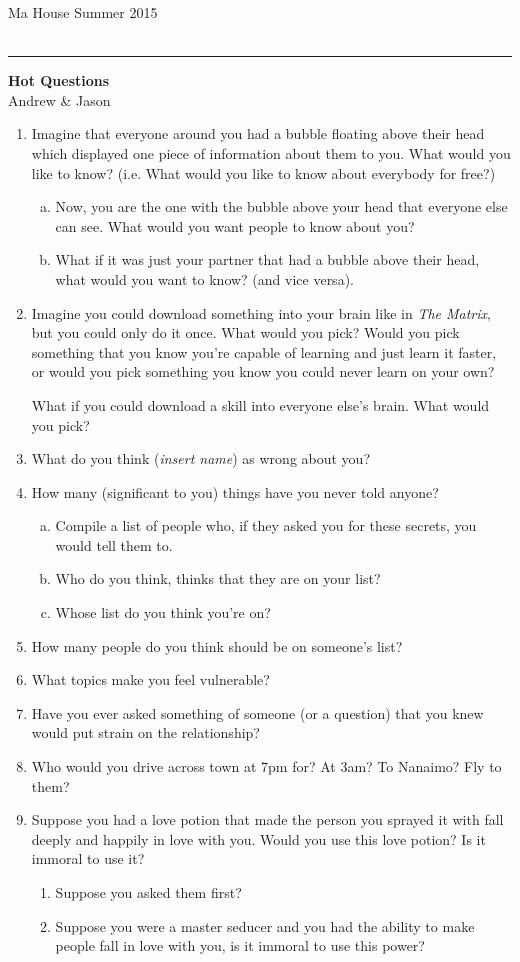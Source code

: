 \documentclass[11pt]{article}
\newcommand{\myheader}[4]{%
	\vspace*{-0.5in}
	\noindent
	{#1} \hfill {#3}\\
	{#2} \hfill {#4}\\
	\rule[8pt]{\textwidth}{1pt}
}
\newcommand{\mytitle}[2]{%
	\begin{center}
		{\large {\bf #1}}\\
		\bigskip
		#2\\ %
		\medskip
	\end{center}
}
\begin{document}
\myheader{Ma House}{}{Summer 2015}{}
\mytitle{Hot Questions}{Andrew \& Jason}

\begin{enumerate}
	\item Imagine that everyone around you had a bubble floating above their head which displayed one piece of information about
		them to you. What would you like to know? (i.e. What would you like to know about everybody for free?)
		\begin{enumerate}[(a)]
			\item Now, you are the one with the bubble above your head that everyone else can see. What would you want people to know
				about you?
			\item What if it was just your partner that had a bubble above their head, what would you want to know? (and vice versa).
		\end{enumerate}
	\item Imagine you could download something into your brain like in \emph{The Matrix}, but you could
		only do it once.  What would you pick?  Would you pick something that you know you're capable 
		of learning and just learn it faster, or would you pick something you know you could never learn
		on your own?

		What if you could download a skill into everyone else's brain.  What would you pick?

	\item What do you think (\emph{insert name}) as wrong about you?

	\item How many (significant to you) things have you never told anyone?
		\begin{enumerate}[(a)]
			\item Compile a list of people who, if they asked you for these secrets, you would tell them to.
			\item Who do you think, thinks that they are on your list?
			\item Whose list do you think you're on?
		\end{enumerate}

	\item How many people do you think should be on someone's list? 
	\item What topics make you feel vulnerable?
	\item Have you ever asked something of someone (or a question) that you knew would put strain on the relationship?
	\item Who would you drive across town at 7pm for? At 3am? To Nanaimo? Fly to them?
	\item Suppose you had a love potion that made the person you sprayed it with fall deeply and happily in love with you.
		Would you use this love potion? Is it immoral to use it?
		\begin{enumerate}
			\item Suppose you asked them first?
			\item Suppose you were a master seducer and you had the ability to make people fall in love with you, is it 
				immoral to use this power?


\end{enumerate}
\end{enumerate}
\end{document}
